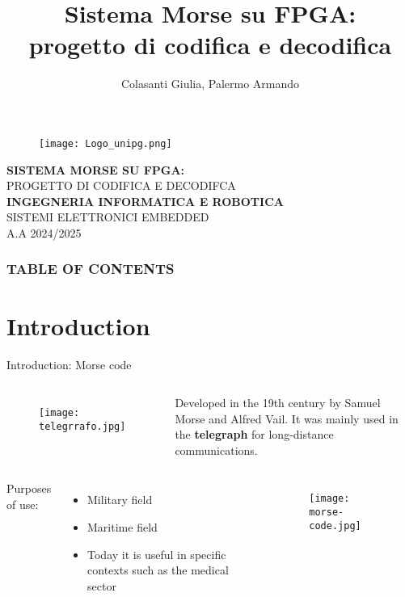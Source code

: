 \documentclass[9pt]{beamer}
\title{Sistema Morse su FPGA: \\
progetto di codifica e decodifica}
\author{Colasanti Giulia, Palermo Armando }
\institute{}
\begin{document}
\begin{frame} 
\centering 

\begin{figure}[H] 
\centering 
\texttt{[image: Logo\_unipg.png]}
\end{figure} 
\textbf{\Huge SISTEMA MORSE SU FPGA: \\ 
}
\huge PROGETTO DI CODIFICA E DECODIFCA \\
\vspace{0.5cm}
\small \textbf{INGEGNERIA INFORMATICA E ROBOTICA} \\
\small SISTEMI ELETTRONICI EMBEDDED \\
\vspace{0.5cm}
\tiny A.A 2024/2025 
\end{frame}


\begin{frame}

 \frametitle{TABLE OF CONTENTS}
 \tableofcontents
\end{frame}

\section{Introduction} %
\begin{frame}{Introduction: Morse code}%
\begin{columns}
\begin{figure}
           \texttt{[image: telegrrafo.jpg]}
       \end{figure}
Developed in the 19th century by Samuel Morse and Alfred Vail. It was mainly used in the \textbf{telegraph} for long-distance communications.
\end{columns}
\vspace{2mm}

\begin{columns}
Purposes of use: 
\begin{itemize} 
\item Military field 
\item Maritime field 
\item Today it is useful in specific contexts such as the medical sector 
\end{itemize}
\begin{figure}
           \texttt{[image: morse-code.jpg]}
\end{figure}
\end{columns}

    
\end{frame}
\end{document}
